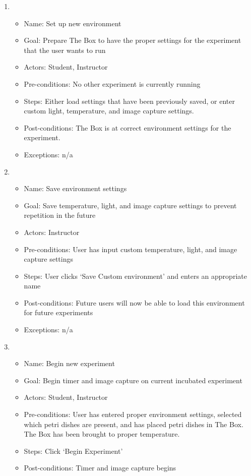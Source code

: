 \begin{enumerate}
	\item 
	\begin{itemize}
		\item Name: Set up new environment
		\item Goal: Prepare The Box to have the proper settings for the experiment that the user wants to run
		\item Actors: Student, Instructor
		\item Pre-conditions: No other experiment is currently running
		\item Steps: Either load settings that have been previously saved, or enter custom light, temperature, and image capture settings. 
		\item Post-conditions: The Box is at correct environment settings for the experiment.
		\item Exceptions: n/a
	\end{itemize}
	\item 
	\begin{itemize}
		\item Name: Save environment settings
		\item Goal: Save temperature, light, and image capture settings to prevent repetition in the future
		\item Actors: Instructor
		\item Pre-conditions: User has input custom temperature, light, and image capture settings
		\item Steps: User clicks `Save Custom environment' and enters an appropriate name
		\item Post-conditions: Future users will now be able to load this environment for future experiments
		\item Exceptions: n/a
	\end{itemize}
	\item 
	\begin{itemize}
		\item Name: Begin new experiment
		\item Goal: Begin timer and image capture on current incubated experiment
		\item Actors:  Student, Instructor
		\item Pre-conditions: User has entered proper environment settings, selected which petri dishes are present, and has placed petri dishes in The Box. The Box has been brought to proper temperature.
		\item Steps: Click `Begin Experiment'
		\item Post-conditions: Timer and image capture begins

\end{itemize}
\end{enumerate}
